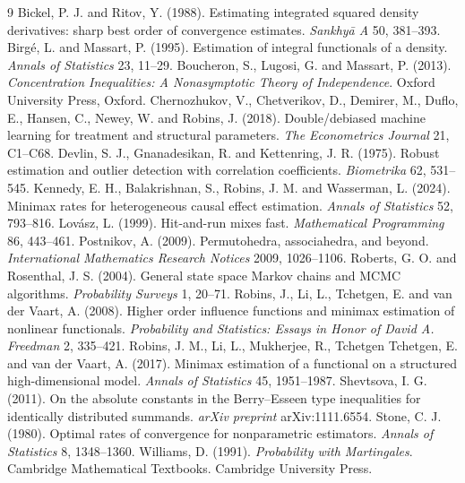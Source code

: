\documentclass[11pt]{article}
\theoremstyle{plain}
\theoremstyle{definition}
\theoremstyle{remark}
\begin{document}
\begin{thebibliography}{9}
 Bickel, P. J. and Ritov, Y. (1988).
  Estimating integrated squared density derivatives: sharp best order of convergence
  estimates. \emph{Sankhy\={a} A} 50, 381--393.
 Birg\'e, L. and Massart, P.
  (1995). Estimation of integral functionals of a density. \emph{Annals of
  Statistics} 23, 11--29.
 Boucheron, S., Lugosi, G.
  and Massart, P. (2013). \emph{Concentration Inequalities: A Nonasymptotic Theory of
  Independence}. Oxford University Press, Oxford.
 Chernozhukov, V., Chetverikov,
  D., Demirer, M., Duflo, E., Hansen, C., Newey, W. and Robins, J. (2018).
  Double/debiased machine learning for treatment and structural parameters.
  \emph{The Econometrics Journal} 21, C1--C68.
 Devlin, S. J.,
  Gnanadesikan, R. and Kettenring, J. R. (1975). Robust estimation and outlier
  detection with correlation coefficients. \emph{Biometrika} 62, 531--545.
 Kennedy, E. H., Balakrishnan, S.,
  Robins, J. M. and Wasserman, L. (2024). Minimax rates for heterogeneous causal
  effect estimation. \emph{Annals of Statistics} 52, 793--816.
 Lov\'asz, L. (1999). Hit-and-run mixes
  fast. \emph{Mathematical Programming} 86, 443--461.
 Postnikov, A. (2009). Permutohedra,
  associahedra, and beyond. \emph{International Mathematics Research Notices} 2009,
  1026--1106.
 Roberts, G. O. and Rosenthal,
  J. S. (2004). General state space Markov chains and MCMC algorithms.
  \emph{Probability Surveys} 1, 20--71.
 Robins, J., Li, L., Tchetgen, E. and van
  der Vaart, A. (2008). Higher order influence functions and minimax estimation of
  nonlinear functionals. \emph{Probability and Statistics: Essays in Honor of David
  A. Freedman} 2, 335--421.
 Robins, J. M., Li, L., Mukherjee, R.,
  Tchetgen Tchetgen, E. and van der Vaart, A. (2017). Minimax estimation of a
  functional on a structured high-dimensional model. \emph{Annals of Statistics} 45,
  1951--1987.
 Shevtsova, I. G. (2011). On the absolute
  constants in the Berry--Esseen type inequalities for identically distributed
  summands. \emph{arXiv preprint} arXiv:1111.6554.
 Stone, C. J. (1980). Optimal rates of convergence
  for nonparametric estimators. \emph{Annals of Statistics} 8, 1348--1360.
 Williams, D. (1991). \emph{Probability with
  Martingales}. Cambridge Mathematical Textbooks. Cambridge University Press.
\end{thebibliography}
\end{document}
